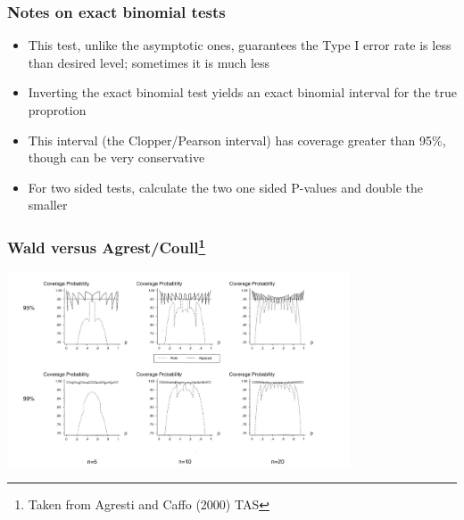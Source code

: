 \documentclass[aspectratio=169]{beamer}
\begin{document}
\begin{frame}\frametitle{Notes on exact binomial tests}
  \begin{itemize}
  \item This test, unlike the asymptotic ones, guarantees the Type I error rate
    is less than desired level; sometimes it is much less
  \item Inverting the exact binomial test yields an exact binomial
    interval for the true proprotion 
  \item This interval (the Clopper/Pearson interval) has coverage greater
    than 95\%, though can be very conservative
  \item For two sided tests, calculate the two one sided P-values and double the
    smaller
  \end{itemize}
\end{frame}

\begin{frame}\frametitle{Wald versus Agrest/Coull\footnote{Taken from Agresti and Caffo (2000) TAS }}
\begin{center}
\includegraphics[width=4in]{waldCoverage.pdf}
\end{center}
\end{frame}
\end{document}

